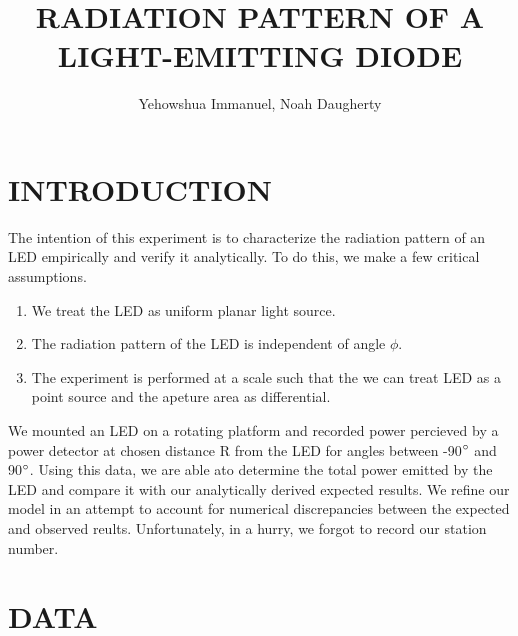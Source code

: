 \documentclass[10pt,a4paper]{article}
\title{RADIATION PATTERN OF A LIGHT-EMITTING DIODE}
\author{Yehowshua Immanuel, Noah Daugherty}
\begin{document}
\maketitle
\tableofcontents
\newpage

\section{INTRODUCTION}
The intention of this experiment is to characterize the radiation pattern of an LED empirically and verify it analytically. To do this, we make a few critical assumptions.
\begin{enumerate}
\item We treat the LED as uniform planar light source.
\item The radiation pattern of the LED is independent of angle $\phi$.
\item The experiment is performed at a scale such that the we can treat LED as a point source and the apeture area as differential.
\end{enumerate}

We mounted an LED on a rotating platform and recorded power percieved by a power detector at chosen distance R from the LED for angles between -90$\degree$ and 90$\degree$. Using this data, we are able ato determine the total power emitted by the LED and compare it with our analytically derived expected results. We refine our model in an attempt to account for numerical discrepancies between the expected and observed reults. Unfortunately, in a hurry, we forgot to record our station number.
\section{DATA}
\end{document}
